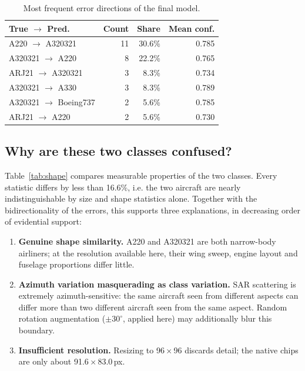 \documentclass[sigconf, screen]{acmart}
\begin{document}
\begin{table}[t]
\caption{Most frequent error directions of the final model.}
\label{tab:errdir}
\small
\begin{tabular}{@{}lrrr@{}}
\toprule
True $\rightarrow$ Pred. & Count & Share & Mean conf. \\
\midrule
A220 $\rightarrow$ A320321 & 11 & 30.6\% & 0.785 \\
A320321 $\rightarrow$ A220 & 8 & 22.2\% & 0.765 \\
ARJ21 $\rightarrow$ A320321 & 3 & 8.3\% & 0.734 \\
A320321 $\rightarrow$ A330 & 3 & 8.3\% & 0.789 \\
A320321 $\rightarrow$ Boeing737 & 2 & 5.6\% & 0.785 \\
ARJ21 $\rightarrow$ A220 & 2 & 5.6\% & 0.730 \\
\bottomrule
\end{tabular}
\end{table}

\subsection{Why are these two classes confused?}
Table~\ref{tab:shape} compares measurable properties of the two classes. Every
statistic differs by less than 16.6\%, i.e. the two aircraft are
nearly indistinguishable by size and shape statistics alone. Together with the
bidirectionality of the errors, this supports three explanations, in decreasing
order of evidential support:

\begin{enumerate}
\item \textbf{Genuine shape similarity.} A220 and A320321 are both narrow-body
      airliners; at the resolution available here, their wing sweep, engine
      layout and fuselage proportions differ little.
\item \textbf{Azimuth variation masquerading as class variation.} SAR scattering
      is extremely azimuth-sensitive: the same aircraft seen from different
      aspects can differ more than two different aircraft seen from the same
      aspect. Random rotation augmentation ($\pm30^\circ$, applied here) may
      additionally blur this boundary.
\item \textbf{Insufficient resolution.} Resizing to 96\,$\times$\,96
      discards detail; the native chips are only about 91.6\,$\times$\,83.0\,px.
\end{enumerate}
\end{document}
